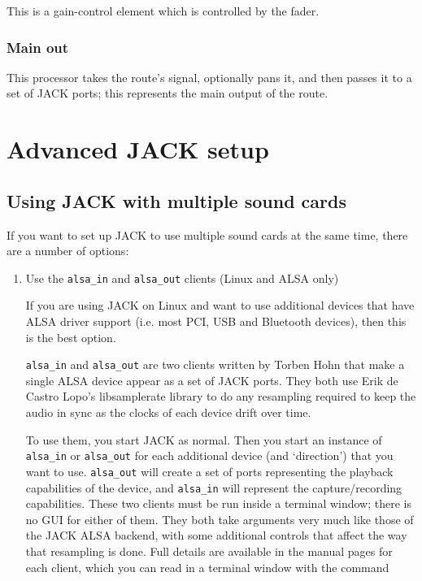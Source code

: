 \documentclass[10pt,a4paper]{book}
\begin{document}
{This is a gain-control element which is controlled by the fader.

\subsection{Main out}

This processor takes the route's signal, optionally pans it, and then
passes it to a set of JACK ports; this represents the main output of
the route.


\appendix
\chapter{Advanced JACK setup}
\label{ap:advanced-jack}

\section{Using JACK with multiple sound cards}

If you want to set up JACK to use multiple sound cards at the same
time, there are a number of options:

\begin{enumerate}

\item Use the \texttt{alsa\_in} and \texttt{alsa\_out} clients (Linux and ALSA only)

If you are using JACK on Linux and want to use additional devices that
have ALSA driver support (i.e. most PCI, USB and Bluetooth devices),
then this is the best option.

\texttt{alsa\_in} and \texttt{alsa\_out} are two clients written by
Torben Hohn that make a single ALSA device appear as a set
of JACK ports. They both use Erik de Castro Lopo's libsamplerate
library to do any resampling required to keep the audio in sync as the
clocks of each device drift over time.

To use them, you start JACK as normal. Then you start an instance of
\texttt{alsa\_in} or \texttt{alsa\_out} for each additional device
(and `direction') that you want to use. \texttt{alsa\_out} will create
a set of ports representing the playback capabilities of the device,
and \texttt{alsa\_in} will represent the capture/recording
capabilities. These two clients must be run inside a terminal window; 
there is no GUI for either of them. They both take arguments very much
like those of the JACK ALSA backend, with some additional controls
that affect the way that resampling is done. Full details are
available in the manual pages for each client, which you can read in a
terminal window with the command


\end{enumerate}}
\end{document}
